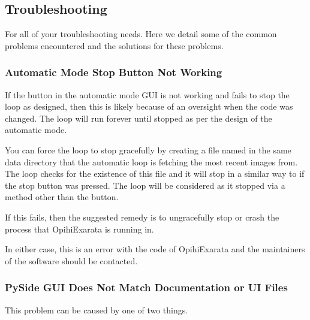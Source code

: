 \documentclass[letterpaper,11pt,english]{sphinxmanual}
\begin{document}
\subsection{Troubleshooting}
\label{\detokenize{user/troubleshooting:troubleshooting}}\label{\detokenize{user/troubleshooting:user-troubleshooting}}\label{\detokenize{user/troubleshooting::doc}}
\sphinxAtStartPar
For all of your troubleshooting needs. Here we detail some of the common
problems encountered and the solutions for these problems.


\subsubsection{Automatic Mode Stop Button Not Working}
\label{\detokenize{user/troubleshooting:automatic-mode-stop-button-not-working}}\label{\detokenize{user/troubleshooting:user-troubleshooting-automatic-mode-stop-button-not-working}}
\sphinxAtStartPar
If the  button in the automatic mode GUI is not working and
fails to stop the loop as designed, then this is likely because of an oversight
when the code was changed. The loop will run forever until stopped as per the
design of the automatic mode.

\sphinxAtStartPar
You can force the loop to stop gracefully by creating a file named
 in the same data directory that the
automatic loop is fetching the most recent images from. The loop checks for the
existence of this file and it will stop in a similar way to if the stop button
was pressed. The loop will be considered  as it stopped via
a method other than the  button.

\sphinxAtStartPar
If this fails, then the suggested remedy is to ungracefully stop or crash the
process that OpihiExarata is running in.

\sphinxAtStartPar
In either case, this is an error with the code of OpihiExarata and the
maintainers of the software should be contacted.


\subsubsection{PySide GUI Does Not Match Documentation or UI Files}
\label{\detokenize{user/troubleshooting:pyside-gui-does-not-match-documentation-or-ui-files}}\label{\detokenize{user/troubleshooting:user-troubleshooting-pyside-gui-does-not-match-documentation-or-ui-files}}
\sphinxAtStartPar
This problem can be caused by one of two things.
\end{document}
